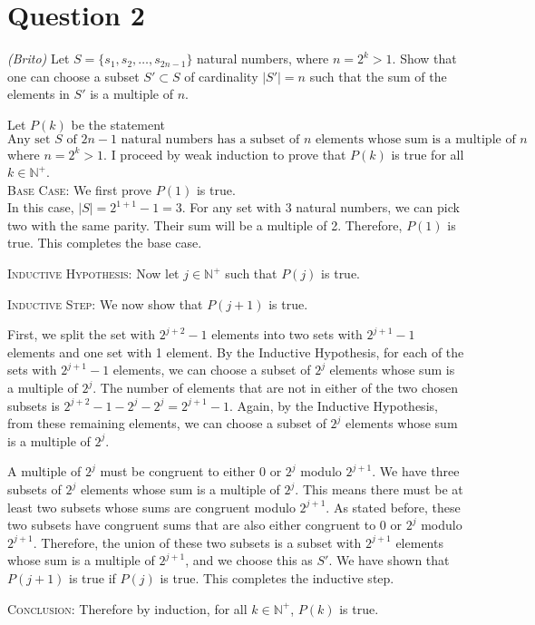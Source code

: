 \documentclass{article}
\begin{document}
\section*{Question 2 }
    \textit{(Brito)} Let $S=\{s_1,s_2,\ldots, s_{2n-1}\}$ natural numbers, where $n=2^k>1$. Show that one can choose a subset $S'\subset S$ of cardinality $|S'|=n$ such that the sum of the elements in $S'$ is a multiple of $n$.
    \begin{tcolorbox}
        Let $P(k)$ be the statement $$\text{Any set $S$ of $2n - 1$ natural numbers has a subset of $n$ elements whose sum is a multiple of $n$}$$
        where $n = 2^k > 1$. I proceed by weak induction to prove that $P(k)$ is true for all $k \in \mathbb{N}^+$.\\
        
        \medskip
        \textsc{Base Case:} We first prove $P(1)$ is true. \\
        In this case, $|S|= 2^{1 + 1} - 1 = 3$. For any set with 3 natural numbers, we can pick two with the same parity. Their sum will be a multiple of 2. Therefore, $P(1)$ is true. This completes the base case.

        \medskip
        \vspace{2mm}
        \textsc{Inductive Hypothesis:} Now let $j \in \mathbb{N}^{+}$ such that $P(j)$ is true.

        \medskip
        \vspace{2mm}
        \textsc{Inductive Step:} We now show that $P(j + 1)$ is true.
        
        \medskip
        First, we split the set with $2^{j+2} - 1$ elements into two sets with $2^{j+1} - 1$ elements and one set with 1 element. By the Inductive Hypothesis, for each of the sets with $2^{j+1} - 1$ elements, we can choose a subset of $2^j$ elements whose sum is a multiple of $2^j$. The number of elements that are not in either of the two chosen subsets is $2^{j+2} - 1 - 2^j - 2^j = 2^{j+1} - 1$. Again, by the Inductive Hypothesis, from these remaining elements, we can choose a subset of $2^j$ elements whose sum is a multiple of $2^j$.

        \medskip
        A multiple of $2^j$ must be congruent to either 0 or $2^j$ modulo $2^{j+1}$. We have three subsets of $2^j$ elements whose sum is a multiple of $2^j$. This means there must be at least two subsets whose sums are congruent modulo $2^{j+1}$. As stated before, these two subsets have congruent sums that are also either congruent to 0 or $2^j$ modulo $2^{j+1}$. Therefore, the union of these two subsets is a subset with $2^{j + 1}$ elements whose sum is a multiple of $2^{j+1}$, and we choose this as $S'$. We have shown that $P(j + 1)$ is true if $P(j)$ is true. This completes the inductive step.

        \vspace{2mm}
        \textsc{Conclusion:} Therefore by induction, for all $k \in \mathbb{N}^+$, $P(k)$ is true.
\end{tcolorbox}
\end{document}

